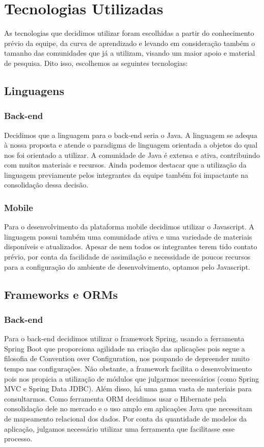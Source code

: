 \chapter{Tecnologias Utilizadas}

As tecnologias que decidimos utilizar foram escolhidas a partir do conhecimento prévio da equipe, da curva de aprendizado e levando em consideração também o tamanho das comunidades que já a utilizam, visando um maior apoio e material de pesquisa.
Dito isso, escolhemos as seguintes tecnologias:

\section{Linguagens}

\subsection{Back-end}

Decidimos que a linguagem para o back-end seria o Java. A linguagem se adequa à nossa proposta e atende o paradigma de linguagem orientada a objetos do qual nos foi orientado a utilizar. 
A comunidade de Java é extensa e ativa, contribuindo com muitos materiais e recursos. Ainda podemos destacar que a utilização da linguagem previamente pelos integrantes da equipe também foi impactante na consolidação dessa decisão.

\subsection{Mobile}
Para o desenvolvimento da plataforma mobile decidimos utilizar o Javascript. A linguagem possui também uma comunidade ativa e uma variedade de materiais disponíveis e atualizados. Apesar de nem todos os integrantes terem tido contato prévio, por conta da facilidade de assimilação e necessidade de poucos recursos para a configuração do ambiente de desenvolvimento, optamos pelo Javascript.

\section{Frameworks e ORMs}

\subsection{Back-end}

Para o back-end decidimos utilizar o framework Spring, usando a ferramenta Spring Boot que proporciona agilidade na criação das aplicações pois segue a filosofia de Convention over Configuration\cite{Devopedia2020}, nos poupando de depreender muito tempo nas configurações. Não obstante, a framework facilita o desenvolvimento pois nos propicia a utilização de módulos que julgarmos necessários (como Spring MVC e Spring Data JDBC). Além disso, há uma gama vasta de materiais para consultarmos.
Como ferramenta ORM decidimos usar o Hibernate pela consolidação dele no mercado e o uso amplo em aplicações Java que necessitam de mapeamento relacional dos dados. Por conta da quantidade de modelos da aplicação, julgamos necessário utilizar uma ferramenta que facilitasse esse processo. 

